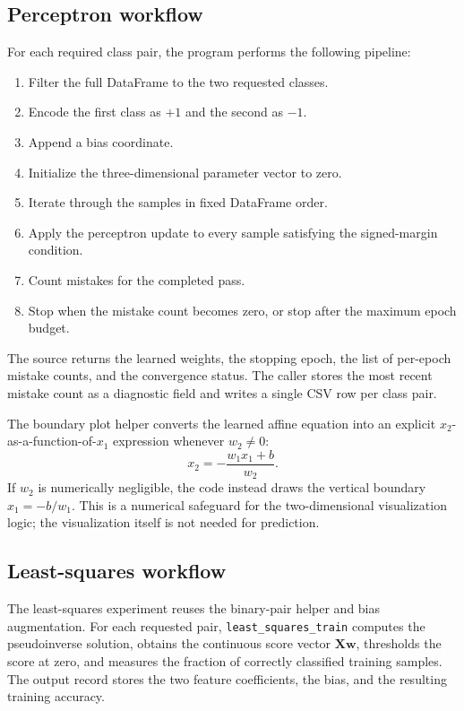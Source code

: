 \documentclass[11pt,a4paper]{article}
\newcommand{\code}[1]{\texttt{#1}}
\begin{document}
\subsection{Perceptron workflow}
For each required class pair, the program performs the following pipeline:
\begin{enumerate}
    \item Filter the full DataFrame to the two requested classes.
    \item Encode the first class as \(+1\) and the second as \(-1\).
    \item Append a bias coordinate.
    \item Initialize the three-dimensional parameter vector to zero.
    \item Iterate through the samples in fixed DataFrame order.
    \item Apply the perceptron update to every sample satisfying the signed-margin condition.
    \item Count mistakes for the completed pass.
    \item Stop when the mistake count becomes zero, or stop after the maximum epoch budget.
\end{enumerate}

The source returns the learned weights, the stopping epoch, the list of per-epoch mistake counts, and the convergence status. The caller stores the most recent mistake count as a diagnostic field and writes a single CSV row per class pair.

The boundary plot helper converts the learned affine equation into an explicit \(x_2\)-as-a-function-of-\(x_1\) expression whenever \(w_2\neq0\):
\begin{equation}
x_2=-\frac{w_1x_1+b}{w_2}.
\end{equation}
If \(w_2\) is numerically negligible, the code instead draws the vertical boundary \(x_1=-b/w_1\). This is a numerical safeguard for the two-dimensional visualization logic; the visualization itself is not needed for prediction.

\subsection{Least-squares workflow}
The least-squares experiment reuses the binary-pair helper and bias augmentation. For each requested pair, \code{least\_squares\_train} computes the pseudoinverse solution, obtains the continuous score vector \(\mathbf{Xw}\), thresholds the score at zero, and measures the fraction of correctly classified training samples. The output record stores the two feature coefficients, the bias, and the resulting training accuracy.
\end{document}
